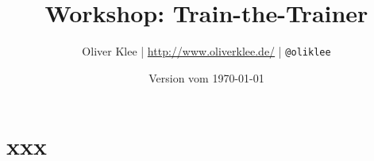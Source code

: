 \documentclass[a4paper,openany,twoside,titlepage,10pt]{scrbook}
\author{Oliver Klee | \url{http://www.oliverklee.de/} | \texttt{@oliklee}}
\title{Workshop: Train-the-Trainer}
\date{Version vom \today}
\begin{document}
\frontmatter

\maketitle

\tableofcontents

\mainmatter

\chapter{xxx}






\backmatter
\end{document}
